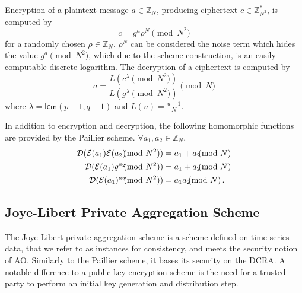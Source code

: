 \documentclass[10pt,letterpaper,oneside,twocolumn,journal]{IEEEtran}
\theoremstyle{definition}
\theoremstyle{definition}
\theoremstyle{remark}
\begin{document}
Encryption of a plaintext message $a \in \mathbb{Z}_N$, producing ciphertext $c \in \mathbb{Z}^{*}_{N^2}$, is computed by
\begin{equation}
    c = g^a \rho^N \pmod{N^2}
\end{equation}
for a randomly chosen $\rho \in \mathbb{Z}_{N}$. $\rho^N$ can be considered the noise term which hides the value $g^a \pmod{N^2}$, which due to the scheme construction, is an easily computable discrete logarithm. The decryption of a ciphertext is computed by
\begin{equation}
    a = \frac{L(c^\lambda\pmod{N^2})}{L(g^\lambda\pmod{N^2})} \pmod{N}
\end{equation}
where $\lambda = \mathsf{lcm}(p-1, q-1)$ and $L(u) = \frac{u-1}{N}$.

In addition to encryption and decryption, the following homomorphic functions are provided by the Paillier scheme. $\forall a_1,a_2 \in \mathbb{Z}_N$,
\begin{align}
    \mathcal{D}(\mathcal{E}(a_1)\mathcal{E}(a_2) \hspace{-7pt} \pmod{N^2}) &= a_1+a_2 \hspace{-7pt} \pmod{N} \\
    \mathcal{D}(\mathcal{E}(a_1)g^{a_2} \hspace{-7pt} \pmod{N^2}) &= a_1+a_2\hspace{-7pt}\pmod{N} \label{eqn:paillier_hom_plain_add}\\
    \mathcal{D}(\mathcal{E}(a_1)^{a_2} \hspace{-7pt} \pmod{N^2}) &= a_1a_2 \hspace{-7pt} \pmod{N}\,. \label{eqn:paillier_hom_mult}
\end{align}

% 
% 

\subsection{Joye-Libert Private Aggregation Scheme} \label{subsec:joye_libert_scheme}
The Joye-Libert private aggregation scheme \cite{joyeScalableSchemePrivacyPreserving2013} is a scheme defined on time-series data, that we refer to as instances for consistency, and meets the security notion of AO. Similarly to the Paillier scheme, it bases its security on the DCRA. A notable difference to a public-key encryption scheme is the need for a trusted party to perform an initial key generation and distribution step.
\end{document}
